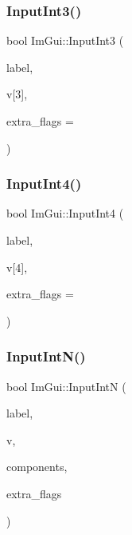 \hypertarget{namespace_im_gui_ab02fc4a19ed153984d3585296e1c74b1}{}\label{namespace_im_gui_ab02fc4a19ed153984d3585296e1c74b1} 
\subsubsection{\texorpdfstring{Input\+Int3()}{InputInt3()}}
{\footnotesize\ttfamily bool Im\+Gui\+::\+Input\+Int3 (\begin{DoxyParamCaption}\item[{const char $\ast$}]{label,  }\item[{int}]{v\mbox{[}3\mbox{]},  }\item[{Im\+Gui\+Input\+Text\+Flags}]{extra\+\_\+flags = {} }\end{DoxyParamCaption})}

\hypertarget{namespace_im_gui_ac714ecf202c82dc6caa0cbf344c85a13}{}\label{namespace_im_gui_ac714ecf202c82dc6caa0cbf344c85a13} 
\subsubsection{\texorpdfstring{Input\+Int4()}{InputInt4()}}
{\footnotesize\ttfamily bool Im\+Gui\+::\+Input\+Int4 (\begin{DoxyParamCaption}\item[{const char $\ast$}]{label,  }\item[{int}]{v\mbox{[}4\mbox{]},  }\item[{Im\+Gui\+Input\+Text\+Flags}]{extra\+\_\+flags = {} }\end{DoxyParamCaption})}

\hypertarget{namespace_im_gui_a9b9aaec8d095156b74ee191b532fa137}{}\label{namespace_im_gui_a9b9aaec8d095156b74ee191b532fa137} 
\subsubsection{\texorpdfstring{Input\+Int\+N()}{InputIntN()}}
{\footnotesize\ttfamily bool Im\+Gui\+::\+Input\+IntN (\begin{DoxyParamCaption}\item[{const char $\ast$}]{label,  }\item[{int $\ast$}]{v,  }\item[{int}]{components,  }\item[{Im\+Gui\+Input\+Text\+Flags}]{extra\+\_\+flags }\end{DoxyParamCaption})}

